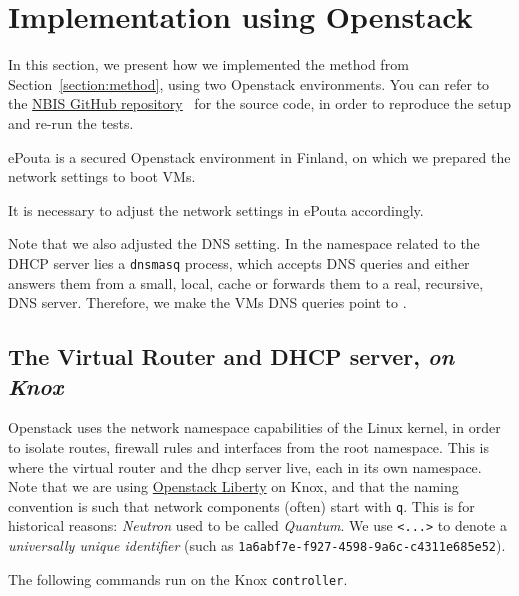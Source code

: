 \section{Implementation using Openstack}
\label{section:implementation}

In this section, we present how we implemented the method from
Section~\ref{section:method}, using two Openstack environments.
%
You can refer to the
\href{https://github.com/NBISweden/Knox-ePouta}{NBIS GitHub
  repository}~\cite{nbis-knox-epouta} for the source code, in order to
reproduce the setup and re-run the tests.
%

  \cutafter

ePouta is a secured Openstack environment in Finland, on which we
prepared the network settings to boot VMs.


It is necessary to adjust the network settings in ePouta accordingly.


Note that we also adjusted the DNS setting. In the namespace related
to the DHCP server lies a \texttt{dnsmasq} process, which accepts DNS
queries and either answers them from a small, local, cache or forwards
them to a real, recursive, DNS server. Therefore, we make the VMs DNS
queries point to .

\subsection{The Virtual Router and DHCP server, \emph{on  Knox}}
\label{section:virtual:router}
\label{section:dhcp:server:knox}

Openstack uses the network namespace capabilities of the Linux kernel,
in order to isolate routes, firewall rules and interfaces from the
root namespace. This is where the virtual router and the dhcp server
live, each in its own namespace. Note that we are using
\href{http://docs.openstack.org/liberty/install-guide-ubuntu/}{Openstack
  Liberty} on Knox, and that the naming convention is such that
network components (often) start with \texttt{q}. This is for
historical reasons: \emph{Neutron} used to be called
\emph{Quantum}. We use \texttt{\textless{}...\textgreater{}} to denote
a \emph{universally unique identifier} (such as
\texttt{1a6abf7e-f927-4598-9a6c-c4311e685e52}).

The following commands run on the Knox \texttt{controller}.

